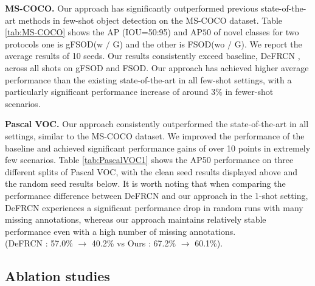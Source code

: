 \documentclass{article}
\begin{document}
{\bf MS-COCO.}
Our approach has significantly outperformed previous state-of-the-art methods in few-shot object detection on the MS-COCO dataset. Table \ref{tab:MS-COCO} shows the AP (IOU=50:95) and $\text{AP50}$ of novel classes for two protocols one is gFSOD(w $\slash$ G) and the other is FSOD(wo $\slash$ G).
We report the average results of 10 seeds.
Our results consistently exceed baseline, DeFRCN \cite{defrcn}, across all shots on gFSOD and FSOD. 
Our approach has achieved higher average performance than the existing state-of-the-art in all few-shot settings, with a particularly significant performance increase of around 3\% in fewer-shot scenarios.

{\bf Pascal VOC.}
Our approach consistently outperformed the state-of-the-art in all settings, similar to the MS-COCO dataset. We improved the performance of the baseline and achieved significant performance gains of over 10 points in extremely few scenarios. Table \ref{tab:PascalVOC1} shows the AP50 performance on three different splits of Pascal VOC, with the clean seed results displayed above and the random seed results below. It is worth noting that when comparing the performance difference between DeFRCN \cite{defrcn} and our approach in the 1-shot setting, DeFRCN experiences a significant performance drop in random runs with many missing annotations, whereas our approach maintains relatively stable performance even with a high number of missing annotations.\\
(DeFRCN : 57.0\% $\rightarrow$ 40.2\% vs Ours : 67.2\% $\rightarrow$ 60.1\%).


\subsection{Ablation studies} 
\end{document}
